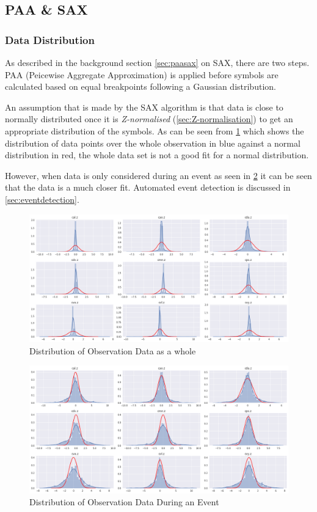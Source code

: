 \documentclass[../report.tex]{subfiles}
\begin{document}
	
\subsection{PAA \& SAX}
	
\subsubsection{Data Distribution} \label{sec:distribution}

	As described in the background section \cref{sec:paasax} on SAX, there are two steps.  PAA (Peicewise Aggregate Approximation) is applied before symbols are calculated based on equal breakpoints following a Gaussian distribution.
	
	An assumption that is made by the SAX algorithm is that data is close to normally distributed  once it is \textit{Z-normalised} (\cref{sec:Z-normalisation}) to get an appropriate distribution of the symbols.  As can be seen from \cref{fig:dist_obs} which shows the distribution of data points over the whole observation in blue against a normal distribution in red, the whole data set is not a good fit for a normal distribution.

	However, when data is only considered during an event as seen in \cref{fig:dist_evt} it can be seen that the data is a much closer fit.  Automated event detection is discussed in \cref{sec:eventdetection}.
	
\begin{figure}[H]
	\centering
	\includegraphics[width=1\linewidth]{img/distribution_obs}
	\caption{Distribution of Observation Data as a whole}
	\label{fig:dist_obs}
\end{figure}

\begin{figure}[H]
	\centering
	\includegraphics[width=1\linewidth]{img/distribution_evt}
	\caption{Distribution of Observation Data During an Event}
	\label{fig:dist_evt}
\end{figure}
\end{document}
